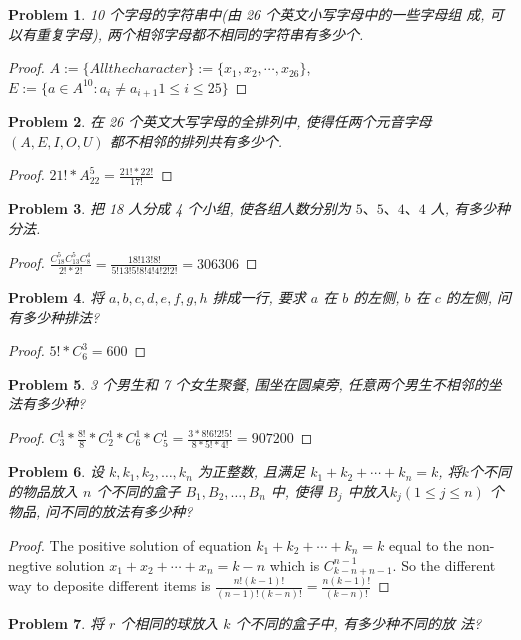 \documentclass{ctexart}
\newtheorem{problem}{\textbf{Problem}}
\renewcommand{\(}{\left(}
\renewcommand{\)}{\right)}
\begin{document}
\begin{problem}
    10 个字母的字符串中(由 26 个英文小写字母中的一些字母组 成, 可以有重复字母), 两个相邻字母都不相同的字符串有多少个.
\end{problem}
\begin{proof}
    $A:=\{All the character\}:=\{x_1,x_2,\cdots,x_{26}\}$, $E:=\{a\in A^{10}:a_i\neq a_{i+1}1\leq i\leq25\}$
\end{proof}
\begin{problem}
    在 26 个英文大写字母的全排列中, 使得任两个元音字母 $(A, E, I, O, U)$ 都不相邻的排列共有多少个.
\end{problem}
\begin{proof}
   $21!*A_{22}^{5}=\frac{21!*22!}{17!}$ 
\end{proof}
\begin{problem}
    把 18 人分成 4 个小组, 使各组人数分别为 $5 、 5 、 4 、 4$ 人, 有多少种分法.
\end{problem}
\begin{proof}
    $\frac{C_{18}^{5}C_{13}^{5}C_{8}^{4}}{2!*2!}=\frac{18!13!8!}{5!13!5!8!4!4!2!2!}=306306$
\end{proof}
\begin{problem}
    将 $a, b, c, d, e, f, g, h$ 排成一行, 要求 $a$ 在 $b$ 的左侧, $b$ 在 $c$ 的左侧, 问有多少种排法?
\end{problem}
\begin{proof}
    $5!*C_{6}^{3}=600$
\end{proof}
\begin{problem}
    3 个男生和 7 个女生聚餐, 围坐在圆桌旁, 任意两个男生不相邻的坐法有多少种?
\end{problem}
\begin{proof}
    $C_{3}^{1}*\frac{8!}{8}*C_{2}^{1}*C_{6}^{1}*C_{5}^{1}=\frac{3*8!6!2!5!}{8*5!*4!}=907200$
\end{proof}
\begin{problem}
    设 $k, k_1, k_2, \ldots, k_n$ 为正整数, 且满足 $k_1+k_2+\cdots+k_n=k$, 将$k$个不同的物品放入 $n$ 个不同的盒子 $B_1, B_2, \ldots, B_n$ 中, 使得 $B_j$ 中放入$k_j(1 \leq j \leq n)$ 个物品, 问不同的放法有多少种?
\end{problem}
\begin{proof}
    The positive solution of equation $k_1+k_2+\cdots+k_n=k$ equal to the non-negtive solution $x_1+x_2+\cdots+x_n=k-n$ which is $C_{k-n+n-1}^{n-1}$. So the different way to deposite different items is $\frac{n!(k-1)!}{(n-1)!(k-n)!}=\frac{n(k-1)!}{(k-n)!}$
\end{proof}
\begin{problem}
    将 $r$ 个相同的球放入 $k$ 个不同的盒子中, 有多少种不同的放 法?
\end{problem}
\end{document}
